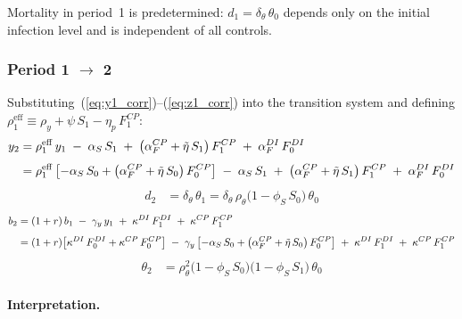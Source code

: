 \documentclass[12pt, a4paper]{article}
\begin{document}
Mortality in period~1 is predetermined: $d_1 = \delta_\theta\, \theta_0$
depends only on the initial infection level and is independent of all controls.

\subsubsection*{Period 1 $\to$ 2}

Substituting~(\ref{eq:y1_corr})--(\ref{eq:z1_corr}) into the transition system
and defining $\rho_1^{\mathrm{eff}} \equiv \rho_y + \psi\, S_1 -
\eta_p\, F_1^{CP}$:
%
\begin{align}
    y_2 &= \rho_1^{\mathrm{eff}}\, y_1
          \;-\; \alpha_S\, S_1
          \;+\; \bigl(\alpha_F^{CP} + \tilde{\eta}\, S_1\bigr)\, F_1^{CP}
          \;+\; \alpha_F^{DI}\, F_0^{DI}
    \notag \\[4pt]
    &= \rho_1^{\mathrm{eff}}\left[
      -\alpha_S\, S_0
      + \bigl(\alpha_F^{CP} + \tilde{\eta}\, S_0\bigr)\, F_0^{CP}
    \right]
    \;-\; \alpha_S\, S_1
    \;+\; \bigl(\alpha_F^{CP} + \tilde{\eta}\, S_1\bigr)\, F_1^{CP}
    \;+\; \alpha_F^{DI}\, F_0^{DI}
    \label{eq:y2_corr}
\end{align}
%
\begin{align}
    d_2 &= \delta_\theta\, \theta_1
         = \delta_\theta\, \rho_\theta\bigl(1 - \phi_S\, S_0\bigr)\, \theta_0
    \label{eq:d2_corr}
\end{align}
%
\begin{align}
    b_2 &= (1+r)\, b_1 \;-\; \gamma_y\, y_1
          \;+\; \kappa^{DI}\, F_1^{DI}
          \;+\; \kappa^{CP}\, F_1^{CP}
    \notag \\[4pt]
    &= (1+r)\bigl[\kappa^{DI}\, F_0^{DI} + \kappa^{CP}\, F_0^{CP}\bigr]
       \;-\; \gamma_y\left[
       -\alpha_S\, S_0
       + \bigl(\alpha_F^{CP} + \tilde{\eta}\, S_0\bigr)\, F_0^{CP}
       \right]
       \;+\; \kappa^{DI}\, F_1^{DI}
       \;+\; \kappa^{CP}\, F_1^{CP}
    \label{eq:b2_corr}
\end{align}
%
\begin{align}
    \theta_2 &= \rho_\theta^2\bigl(1 - \phi_S\, S_0\bigr)
               \bigl(1 - \phi_S\, S_1\bigr)\, \theta_0
    \label{eq:theta2_corr}
\end{align}

\paragraph{Interpretation.}
\end{document}
